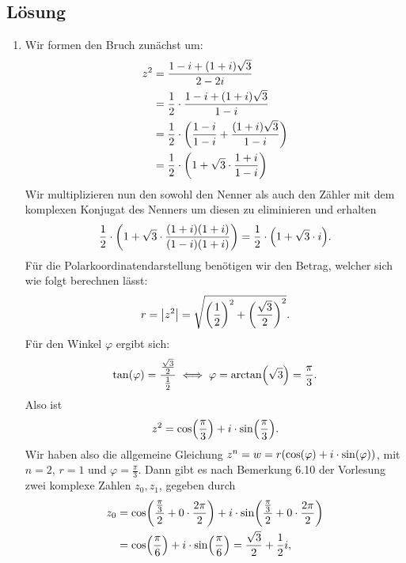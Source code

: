 \documentclass[german,12pt]{homework}
\DeclarePairedDelimiter{\absolute}{\lvert}{\rvert}
\DeclarePairedDelimiter{\enbrace}{(}{)}
\begin{document}
    \subsection*{Lösung}
    \begin{enumerate}
        \item Wir formen den Bruch zunächst um:
        \begin{align*}
            z^2 &= \frac{1 - i + \enbrace*{1 + i}\sqrt{3}}{2 - 2i}\\
            &= \frac{1}{2} \cdot \frac{1 - i + \enbrace*{1 + i}\sqrt{3}}{1 -
            i}\\
            &= \frac{1}{2} \cdot \enbrace*{\frac{1 - i}{1 - i} +
            \frac{\enbrace*{1 + i}\sqrt{3}}{1 - i}}\\
            &= \frac{1}{2} \cdot \enbrace*{1 + \sqrt{3} \cdot \frac{1 + i}{1 -
            i}}
        \end{align*}
        Wir multiplizieren nun den sowohl den Nenner als auch den Zähler mit
        dem komplexen Konjugat des Nenners um diesen zu eliminieren und erhalten
        \[\frac{1}{2} \cdot \enbrace*{1 + \sqrt{3} \cdot \frac{\enbrace*{1 +
        i}\enbrace*{1 + i}}{\enbrace*{1 - i}\enbrace*{1 + i}}} = \frac{1}{2}
        \cdot \enbrace*{1 + \sqrt{3} \cdot i}.\]
        Für die Polarkoordinatendarstellung benötigen wir den Betrag, welcher
        sich wie folgt berechnen lässt:
        \[r = \absolute*{z^2} = \sqrt{\enbrace*{\frac{1}{2}}^2 +
        \enbrace*{\frac{\sqrt{3}}{2}}^2}.\]
        Für den Winkel \(\varphi\) ergibt sich:
        \[\tan\enbrace*{\varphi} = \frac{\frac{\sqrt{3}}{2}}{\frac{1}{2}} \iff
        \varphi = \arctan\enbrace*{\sqrt{3}} = \frac{\pi}{3}.\]
        Also ist
        \[z^2 = \cos\enbrace*{\frac{\pi}{3}} + i \cdot
        \sin\enbrace*{\frac{\pi}{3}}.\]
        Wir haben also die allgemeine Gleichung \(z^n = w =
        r\enbrace*{\cos\enbrace*{\varphi} + i \cdot \sin\enbrace*{\varphi}}\),
        mit \(n = 2\), \(r = 1\) und \(\varphi = \frac{\pi}{3}\). Dann gibt es
        nach Bemerkung 6.10 der Vorlesung zwei komplexe Zahlen \(z_0, z_1\),
        gegeben durch
        \begin{align*}
            z_0 &= \cos\enbrace*{\frac{\frac{\pi}{3}}{2} + 0 \cdot
            \frac{2\pi}{2}} + i \cdot \sin\enbrace*{\frac{\frac{\pi}{3}}{2} + 0
            \cdot \frac{2\pi}{2}}\\
            &= \cos\enbrace*{\frac{\pi}{6}} + i \cdot
            \sin\enbrace*{\frac{\pi}{6}} = \frac{\sqrt{3}}{2} + \frac{1}{2}i,\\

\end{align*}
\end{enumerate}
\end{document}
